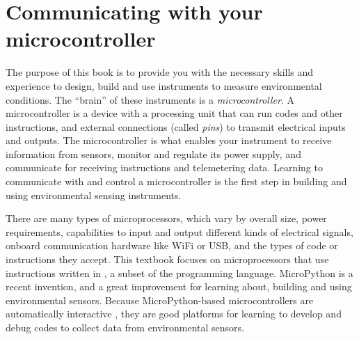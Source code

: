 % 

\setchapterpreamble[u]{\margintoc}
\chapter{Communicating with your microcontroller}

The purpose of this book is to provide you with the necessary skills and experience to design, build and use instruments to measure environmental conditions.
The ``brain'' of these instruments is a \emph{microcontroller}.
A microcontroller is a device with a processing unit that can run codes and other instructions, and external connections (called \emph{pins}) to transmit electrical inputs and outputs.
The microcontroller is what enables your instrument to receive information from sensors, monitor and regulate its power supply, and communicate for receiving instructions and telemetering data.
Learning to communicate with and control a microcontroller is the first step in building and using environmental sensing instruments.

There are many types of microprocessors, which vary by overall size, power requirements, capabilities to input and output different kinds of electrical signals, onboard communication hardware like WiFi or USB, and the types of code or instructions they accept.
%
This textbook focuses on microprocessors that use instructions written in , a subset of the  programming language.
MicroPython is a recent invention, and a great improvement for learning about, building and using environmental sensors.
Because MicroPython-based microcontrollers are automatically interactive
, they are good platforms for learning to develop and debug codes to collect data from environmental sensors.

